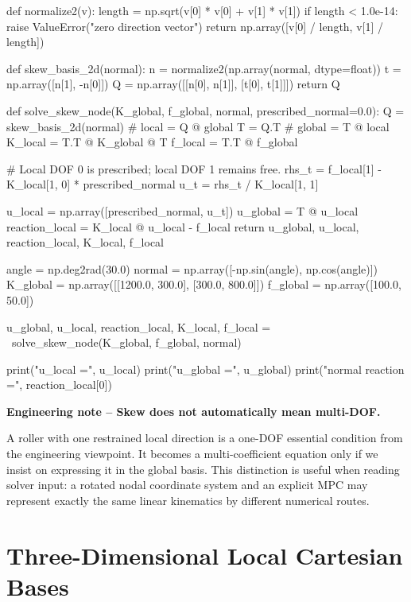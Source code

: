 \begin{python}
def normalize2(v):
    length = np.sqrt(v[0] * v[0] + v[1] * v[1])
    if length < 1.0e-14:
        raise ValueError("zero direction vector")
    return np.array([v[0] / length, v[1] / length])


def skew_basis_2d(normal):
    n = normalize2(np.array(normal, dtype=float))
    t = np.array([n[1], -n[0]])
    Q = np.array([[n[0], n[1]],
                  [t[0], t[1]]])
    return Q


def solve_skew_node(K_global, f_global, normal,
                    prescribed_normal=0.0):
    Q = skew_basis_2d(normal)       # local = Q @ global
    T = Q.T                         # global = T @ local
    K_local = T.T @ K_global @ T
    f_local = T.T @ f_global

    # Local DOF 0 is prescribed; local DOF 1 remains free.
    rhs_t = f_local[1] - K_local[1, 0] * prescribed_normal
    u_t = rhs_t / K_local[1, 1]

    u_local = np.array([prescribed_normal, u_t])
    u_global = T @ u_local
    reaction_local = K_local @ u_local - f_local
    return u_global, u_local, reaction_local, K_local, f_local


angle = np.deg2rad(30.0)
normal = np.array([-np.sin(angle), np.cos(angle)])
K_global = np.array([[1200.0, 300.0],
                     [300.0, 800.0]])
f_global = np.array([100.0, 50.0])

u_global, u_local, reaction_local, K_local, f_local = \
    solve_skew_node(K_global, f_global, normal)

print("u_local =", u_local)
print("u_global =", u_global)
print("normal reaction =", reaction_local[0])
\end{python}

\begin{bbox}
\textbf{Engineering note -- Skew does not automatically mean multi-DOF.}

A roller with one restrained local direction is a one-DOF essential condition
from the engineering viewpoint. It becomes a multi-coefficient equation only if
we insist on expressing it in the global basis. This distinction is useful when
reading solver input: a rotated nodal coordinate system and an explicit MPC may
represent exactly the same linear kinematics by different numerical routes.
\end{bbox}

\section{Three-Dimensional Local Cartesian Bases}

